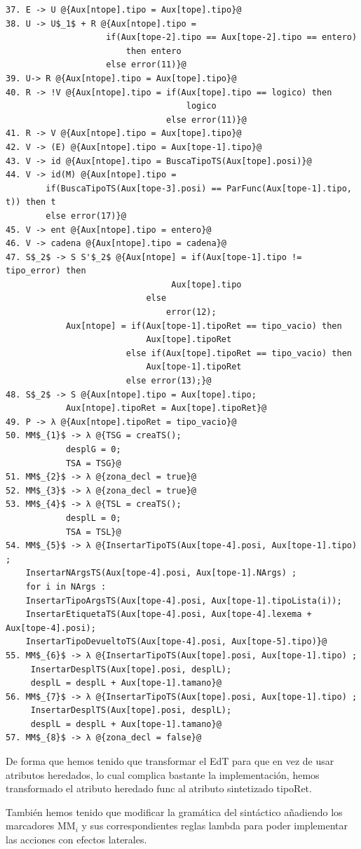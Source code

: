 \documentclass[a4paper, 12pt]{article}
\begin{document}
\begin{lstlisting}[style=EdT]
37. E -> U @{Aux[ntope].tipo = Aux[tope].tipo}@
38. U -> U$_1$ + R @{Aux[ntope].tipo = 
					if(Aux[tope-2].tipo == Aux[tope-2].tipo == entero)
						then entero 
					else error(11)}@
39. U-> R @{Aux[ntope].tipo = Aux[tope].tipo}@
40. R -> !V @{Aux[ntope].tipo = if(Aux[tope].tipo == logico) then 
									logico
             					else error(11)}@
41. R -> V @{Aux[ntope].tipo = Aux[tope].tipo}@
42. V -> (E) @{Aux[ntope].tipo = Aux[tope-1].tipo}@
43. V -> id @{Aux[ntope].tipo = BuscaTipoTS(Aux[tope].posi)}@
44. V -> id(M) @{Aux[ntope].tipo = 
		if(BuscaTipoTS(Aux[tope-3].posi) == ParFunc(Aux[tope-1].tipo, t)) then t
		else error(17)}@
45. V -> ent @{Aux[ntope].tipo = entero}@
46. V -> cadena @{Aux[ntope].tipo = cadena}@
47. S$_2$ -> S S'$_2$ @{Aux[ntope] = if(Aux[tope-1].tipo != tipo_error) then
								 Aux[tope].tipo
							else 
								error(12);
			Aux[ntope] = if(Aux[tope-1].tipoRet == tipo_vacio) then 
							Aux[tope].tipoRet
						else if(Aux[tope].tipoRet == tipo_vacio) then 
							Aux[tope-1].tipoRet 
						else error(13);}@
48. S$_2$ -> S @{Aux[ntope].tipo = Aux[tope].tipo;
			Aux[ntope].tipoRet = Aux[tope].tipoRet}@
49. P -> λ @{Aux[ntope].tipoRet = tipo_vacio}@
50. MM$_{1}$ -> λ @{TSG = creaTS();
			desplG = 0;
			TSA = TSG}@
51. MM$_{2}$ -> λ @{zona_decl = true}@
52. MM$_{3}$ -> λ @{zona_decl = true}@
53. MM$_{4}$ -> λ @{TSL = creaTS();
			desplL = 0;
			TSA = TSL}@
54. MM$_{5}$ -> λ @{InsertarTipoTS(Aux[tope-4].posi, Aux[tope-1].tipo) ;
	InsertarNArgsTS(Aux[tope-4].posi, Aux[tope-1].NArgs) ;
	for i in NArgs :
	InsertarTipoArgsTS(Aux[tope-4].posi, Aux[tope-1].tipoLista(i));
	InsertarEtiquetaTS(Aux[tope-4].posi, Aux[tope-4].lexema + Aux[tope-4].posi); 
	InsertarTipoDevueltoTS(Aux[tope-4].posi, Aux[tope-5].tipo)}@
55. MM$_{6}$ -> λ @{InsertarTipoTS(Aux[tope].posi, Aux[tope-1].tipo) ;
     InsertarDesplTS(Aux[tope].posi, desplL);
     desplL = desplL + Aux[tope-1].tamano}@
56. MM$_{7}$ -> λ @{InsertarTipoTS(Aux[tope].posi, Aux[tope-1].tipo) ;
     InsertarDesplTS(Aux[tope].posi, desplL);
     desplL = desplL + Aux[tope-1].tamano}@
57. MM$_{8}$ -> λ @{zona_decl = false}@
\end{lstlisting}
\newpage
De forma que hemos tenido que transformar el EdT para que en vez de usar atributos heredados, lo cual complica bastante la implementación, hemos transformado el atributo heredado func al atributo sintetizado tipoRet.

También hemos tenido que modificar la gramática del sintáctico añadiendo los marcadores MM$_i$ y sus correspondientes reglas lambda para poder implementar las acciones con efectos laterales.
\end{document}
